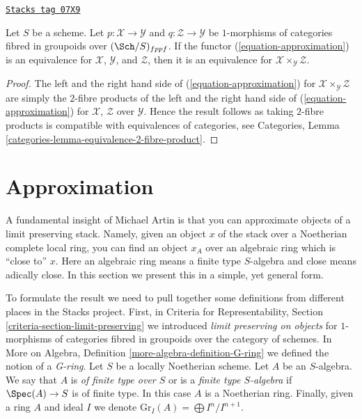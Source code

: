 \begin{lemma}
\label{artin-lemma-fibre-product-effective}
\href{https://stacks.math.columbia.edu/tag/07X9}{\texttt{Stacks tag 07X9}}

Let $S$ be a scheme. Let $p : \mathcal{X} \to \mathcal{Y}$ and
$q : \mathcal{Z} \to \mathcal{Y}$ be $1$-morphisms of categories
fibred in groupoids over $(\Sch/S)_{fppf}$. If the functor
(\ref{equation-approximation}) is an equivalence for
$\mathcal{X}$, $\mathcal{Y}$, and $\mathcal{Z}$, then it is
an equivalence for $\mathcal{X} \times_\mathcal{Y} \mathcal{Z}$.
\end{lemma}

\begin{proof}
The left and the right hand side of (\ref{equation-approximation})
for $\mathcal{X} \times_\mathcal{Y} \mathcal{Z}$ are simply the $2$-fibre
products of the left and the right hand side of (\ref{equation-approximation})
for $\mathcal{X}$, $\mathcal{Z}$ over $\mathcal{Y}$.
Hence the result follows as taking $2$-fibre products is compatible
with equivalences of categories, see
Categories, Lemma \ref{categories-lemma-equivalence-2-fibre-product}.
\end{proof}

\section{Approximation}
\label{artin-section-approximation}
A fundamental insight of Michael Artin is that you can approximate
objects of a limit preserving stack. Namely, given an object $x$
of the stack over a Noetherian complete local ring, you can find
an object $x_A$ over an algebraic ring which is ``close to'' $x$.
Here an algebraic ring means a finite type $S$-algebra and close
means adically close. In this section we present this in a simple,
yet general form.

\medskip\noindent
To formulate the result we need to pull together some definitions from
different places in the Stacks project. First, in
Criteria for Representability, Section \ref{criteria-section-limit-preserving}
we introduced {\it limit preserving on objects} for $1$-morphisms
of categories fibred in groupoids over the category of schemes.
In More on Algebra, Definition \ref{more-algebra-definition-G-ring}
we defined the notion of a {\it G-ring}. Let $S$ be a locally Noetherian scheme.
Let $A$ be an $S$-algebra. We say that $A$ is {\it of finite type over $S$}
or is a {\it finite type $S$-algebra} if $\Spec(A) \to S$ is of finite type.
In this case $A$ is a Noetherian ring. Finally, given a ring $A$ and ideal
$I$ we denote $\text{Gr}_I(A) = \bigoplus I^n/I^{n + 1}$.

